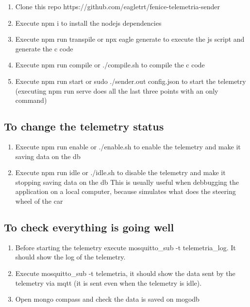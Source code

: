 \begin{enumerate}
    \item Clone this repo https://github.com/eagletrt/fenice-telemetria-sender
    \item Execute npm i to install the nodejs dependencies
    \item Execute npm run transpile or npx eagle generate to execute the js script and generate the c code
    \item Execute npm run compile or ./compile.sh to compile the c code
    \item Execute npm run start or sudo ./sender.out config.json to start the telemetry (executing npm run serve does all the last three points with an only command)
\end{enumerate}

\subsection{To change the telemetry status}

\begin{enumerate}
    \item Execute npm run enable or ./enable.sh to enable the telemetry and make it saving data on the db
    \item Execute npm run idle or ./idle.sh to disable the telemetry and make it stopping saving data on the db This is usually useful when debbugging the application on a local computer, because simulates what does the steering wheel of the car
\end{enumerate}

\subsection{To check everything is going well}

\begin{enumerate}
    \item Before starting the telemetry execute mosquitto\_sub -t telemetria\_log. It should show the log of the telemetry.
    \item Execute mosquitto\_sub -t telemetria, it should show the data sent by the telemetry via mqtt (it is sent even when the telemetry is idle).
    \item Open mongo compass and check the data is saved on mogodb
\end{enumerate}